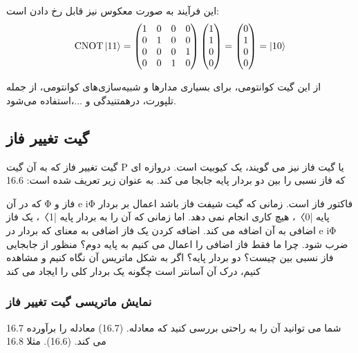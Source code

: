 \documentclass{book}
\begin{document}
این فرآیند به صورت معکوس نیز قابل رخ دادن است:\\

$$
\text{CNOT} \ket{11} = \begin{pmatrix}
	1 & 0 & 0 & 0 \\
	0 & 1 & 0 & 0 \\
	0 & 0 & 0 & 1 \\
	0 & 0 & 1 & 0
\end{pmatrix} \begin{pmatrix}
	1 \\
	1 \\
	0 \\
	0
\end{pmatrix} = \begin{pmatrix}
	0 \\
	1 \\
	0 \\
	0
\end{pmatrix} = \ket{10}
$$
\vspace{2cm}


از این گیت کوانتومی‌، برای بسیاری مدار‌ها و شبیه‌سازی‌های کوانتومی، از جمله تلپورت، درهمتنیدگی و ...،استفاده می‌شود.

\subsection*{گیت تغییر فاز}
گیت تغییر فاز که به آن گیت P یا گیت فاز نیز می گویند، یک کیوبیت است.
دروازه ای که فاز نسبی را بین دو بردار پایه جابجا می کند. به عنوان زیر تعریف شده است:
16.6



که در آن Φ فاز و e iΦ فاکتور فاز است. زمانی که گیت شیفت فاز باشد
اعمال بر بردار پایه |0〉، هیچ کاری انجام نمی دهد. اما زمانی که آن را به
بردار پایه |1〉، یک فاز اضافی به آن اضافه می کند. اضافه کردن یک فاز اضافی به معنای
که بردار در e iΦ ضرب شود. چرا ما فقط فاز اضافی را اعمال می کنیم
به پایه دوم؟ منظور از جابجایی فاز نسبی بین چیست؟
دو بردار پایه؟ اگر به شکل ماتریس آن نگاه کنیم و مشاهده کنیم، درک آن آسانتر است
چگونه یک بردار کلی را ایجاد می کند


\subsubsection{نمایش ماتریسی گیت تغییر فاز}
16.7
شما می توانید آن را به راحتی بررسی کنید که معادله. (16.7) معادله را برآورده می کند. (16.6). مثلا
16.8
\end{document}
